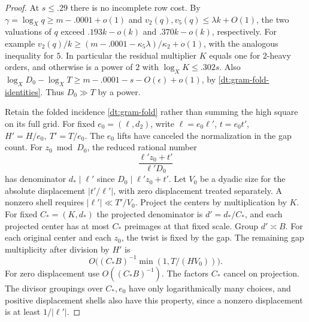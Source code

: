 \documentclass[11pt,a4paper]{article}
\theoremstyle{paperplain}
\numberwithin{equation}{section}
\begin{document}
\begin{proof}
At \(s\le.29\) there is no incomplete row cost. By
\(\gamma=\log_Xq\ge m-.0001+o(1)\) and
\(v_2(q),v_5(q)\le\lambda k+O(1)\), the two valuations
of \(q\) exceed \(.193 k-o(k)\) and \(.370 k-o(k)\),
respectively. For example
\(v_2(q)/k\ge(m-.0001-\kappa_5\lambda)/\kappa_2+o(1)\),
with the analogous inequality for \(5\).
In particular the residual multiplier \(K\) equals one
for \(2\)-heavy orders, and otherwise is a power of \(2\)
with \(\log_XK\le.302s\).
Also
\(\log_XD_0-\log_X T\ge m-.0001-s-O(\epsilon)+o(1)\),
by \eqref{dt:gram-fold-identities}. Thus \(D_0\gg T\)
by a power.

Retain the folded incidence \eqref{dt:gram-fold} rather
than summing the high square on its full grid. For fixed
\(e_0=(\ell,d_2)\), write \(\ell=e_0\ell'\),
\(t=e_0t'\), \(H'=H/e_0,\ T'=T/e_0\).
The \(e_0\) lifts have canceled the normalization in the
gap count. For \(z_0\bmod D_0\), the reduced rational number
\[
             \frac{\ell' z_0+t'}{\ell'D_0}
\]
has denominator \(d_*\mid\ell'\) since
\(D_0\mid\ell'z_0+t'\). Let \(V_0\) be a dyadic size
for the absolute displacement \(|t'/\ell'|\), with
zero displacement treated separately. A nonzero shell
requires \(|\ell'|\ll T'/V_0\).
Project the centers by multiplication by \(K\).
For fixed \(C_*=(K,d_*)\) the projected denominator is
\(d'=d_*/C_*\), and each projected center has at most \(C_*\)
preimages at that fixed scale. Group \(d'\asymp B\).
For each original center and each \(z_0\), the twist is fixed
by the gap. The remaining gap multiplicity after division
by \(H'\) is
\[
     O\bigl((C_*B)^{-1}\min(1,T/(HV_0))\bigr).
\]
For zero displacement use \(O((C_*B)^{-1})\). The factors
\(C_*\) cancel on projection. The divisor groupings
over \(C_*,e_0\) have only logarithmically many choices,
and positive displacement shells also have this property,
since a nonzero displacement is at least \(1/|\ell'|\).


\end{proof}
\end{document}
